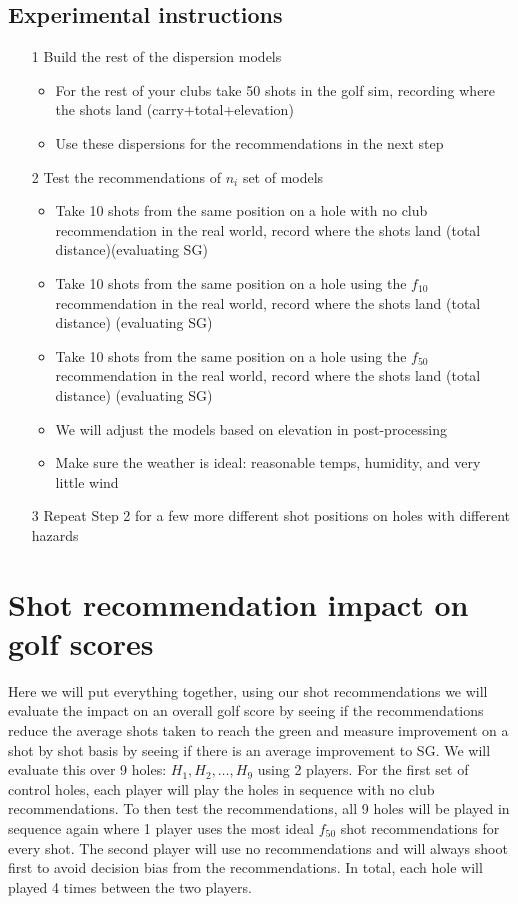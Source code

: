 \documentclass{article}
\begin{document}
\subsection{Experimental instructions}
\begin{itemize}
	\item[1] Build the rest of the dispersion models 
		\begin{itemize}
			\item For the rest of your clubs take 50 shots in the golf sim, recording where the shots land (carry+total+elevation)
			\item Use these dispersions for the recommendations in the next step
		\end{itemize}
	\item[2] Test the recommendations of $n_i$ set of models 
		\begin{itemize}
			\item Take 10 shots from the same position on a hole with no club recommendation in the real world, record where the shots land (total distance)(evaluating SG)
			\item Take 10 shots from the same position on a hole using the $f_{10}$ recommendation in the real world, record where the shots land (total distance) (evaluating SG)
			\item Take 10 shots from the same position on a hole using the $f_{50}$ recommendation in the real world, record where the shots land (total distance) (evaluating SG)
			\item We will adjust the models based on elevation in post-processing
			\item Make sure the weather is ideal: reasonable temps, humidity, and very little wind
		\end{itemize}
	\item[3] Repeat Step 2 for a few more different shot positions on holes with different hazards
\end{itemize}

\section{Shot recommendation impact on golf scores}
Here we will put everything together, using our shot recommendations we will evaluate the impact on an overall golf score by seeing if the recommendations reduce the average shots taken to reach the green and measure improvement on a shot by shot basis by seeing if there is an average improvement to SG. We will evaluate this over 9 holes: ${H_1, H_2, \ldots, H_9}$ using 2 players. For the first set of control holes, each player will play the holes in sequence with no club recommendations. To then test the recommendations, all 9 holes will be played in sequence again where 1 player uses the most ideal $f_{50}$ shot recommendations for every shot. The second player will use no recommendations and will always shoot first to avoid decision bias from the recommendations. In total, each hole will played 4 times between the two players. 
\end{document}

